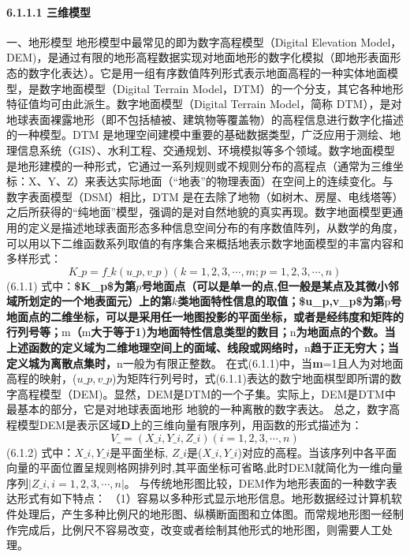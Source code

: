 {{\paragraph{6.1.1.1 三维模型}\label{ux4e09ux7ef4ux6a21ux578b} 一、地形模型 地形模型中最常见的即为数字高程模型（Digital Elevation
Model，DEM)，是通过有限的地形高程数据实现对地面地形的数字化模拟（即地形表面形态的数字化表达）。它是用一组有序数值阵列形式表示地面高程的一种实体地面模型，是数字地面模型（Digital Terrain
Model，DTM）的一个分支，其它各种地形特征值均可由此派生。数字地面模型（Digital Terrain Model，简称 DTM），是对地球表面裸露地形（即不包括植被、建筑物等覆盖物）的高程信息进行数字化描述的一种模型。DTM
是地理空间建模中重要的基础数据类型，广泛应用于测绘、地理信息系统（GIS）、水利工程、交通规划、环境模拟等多个领域。数字地面模型是地形建模的一种形式，它通过一系列规则或不规则分布的高程点（通常为三维坐标：X、Y、Z）来表达实际地面（``地表''的物理表面）在空间上的连续变化。与数字表面模型（DSM）相比，DTM
是在去除了地物（如树木、房屋、电线塔等）之后所获得的``纯地面''模型，强调的是对自然地貌的真实再现。数字地面模型更通用的定义是描述地球表面形态多种信息空间分布的有序数值阵列，从数学的角度，可以用以下二维函数系列取值的有序集合来概括地表示数字地面模型的丰富内容和多样形式：
\[ K\_p = f\_k(u\_p,v\_p)(k=1,2,3,\cdots,m;p=1,2,3,\cdots,n) \] (6.1.1)
式中：\textbf{\$K\_p\$为第}\(p\)\textbf{号地面点（可以是单一的点,但一般是某点及其微小邻域所划定的一个地表面元）上的第}\(k\)\textbf{类地面特性信息的取值；\$u\_p,v\_p\$为第}p\textbf{号地面点的二维坐标，可以是采用任一地图投影的平面坐标，或者是经纬度和矩阵的行列号等；}m\textbf{（}m\textbf{大于等于1)为地面特性信息类型的数目；}n\textbf{为地面点的个数。当上述函数的定义域为二维地理空间上的面域、线段或网络时，}n\textbf{趋于正无穷大；当定义城为离散点集时，}n一般为有限正整数。
在式(6.1.1)中，当\textbf{m}=1且人为对地面高程的映射，(\(u\_p,v\_p\))为矩阵行列号时，式(6.1.1)表达的数宁地面棋型即所谓的数字高程模型（DEM)。显然，DEM是DTM的一个子集。实际上，DEM是DTM中最基本的部分，它是对地球表面地形
地貌的一种离散的数字表达。 总之，数字高程模型DEM是表示区域\textbf{D}上的三维向量有限序列，用函数的形式描述为： \[ V\_=(X\_i,Y\_i,Z\_i)(i=1,2,3,\cdots,n) \] (6.1.2)
式中：\(X\_i,Y\_i\)是平面坐标,
\(Z\_i\)是(\(X\_i,Y\_i\))对应的高程。当该序列中各平面向量的平面位置呈规则格网排列时,其平面坐标可省略,此时DEM就简化为一维向量序列\(|Z\_i,i=1,2,3,\cdots,n|\)。
与传统地形图比较，DEM作为地形表面的一种数字表达形式有如下特点：
（1）容易以多种形式显示地形信息。地形数据经过计算机软件处理后，产生多种比例尺的地形图、纵横断面图和立体图。而常规地形图一经制作完成后，比例尺不容易改变，改变或者绘制其他形式的地形图，则需要人工处理。
}}
